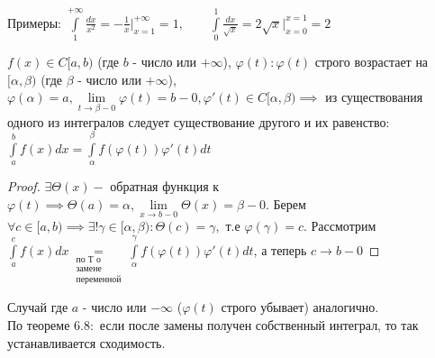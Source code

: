\documentclass[../main.tex]{subfiles}
\begin{document}
Примеры: $\int\limits_{1}^{+\infty}\frac{dx}{x^{2}}=-\frac{1}{x}\bigg|_{x=1}^{+\infty}=1, \qquad \int\limits_{0}^{1}\frac{dx}{\sqrt{x}}=2\sqrt{x}\bigg|_{x=0}^{x=1}=2 $
\vspace{0.5cm}
\begin{theorem}
    $f(x)\in C[a,b)$ (где $b$ - число или $+\infty$), $\varphi(t): \varphi(t)$ строго возрастает на $[\alpha,\beta)$ (где $\beta$ - число или $+\infty$), $\varphi(\alpha)=a, \lim\limits_{t    \to \beta-0}\varphi(t)=b-0 ,\varphi'(t) \in C[\alpha,\beta) \implies $ из существования одного из интегралов следует существование другого и их равенство: $\int\limits_{a  }^{b  }f(x)dx=\int\limits_{\alpha       }^{\beta}f(\varphi(t))\varphi'(t)dt  $
\end{theorem}
\begin{proof}
    $\exists \Theta(x) -$ обратная функция к $\varphi(t)\implies \Theta(a)=\alpha,\lim\limits_{x\to b-0}\Theta(x)=\beta-0.$ Берем $\forall c \in[a,b)\implies \exists! \gamma \in [\alpha,\beta): \Theta(c)=\gamma,$ т.е $\varphi(\gamma)=c.$ Рассмотрим $\int\limits_{a  }^{c  }f(x)dx\underset{\substack{\text{по Т о} \\ \text{замене} \\ \text{переменной}}}{=}\int\limits_{\alpha       }^{\gamma}f(\varphi(t))\varphi'(t)dt$, а теперь $c\to b-0$
\end{proof}
\noindent Случай где $a$ - число или $-\infty$ ($\varphi(t)$ строго убывает) аналогично.\\
По теореме $6.8:$ если после замены получен собственный интеграл, то так устанавливается сходимость. 
\end{document}
